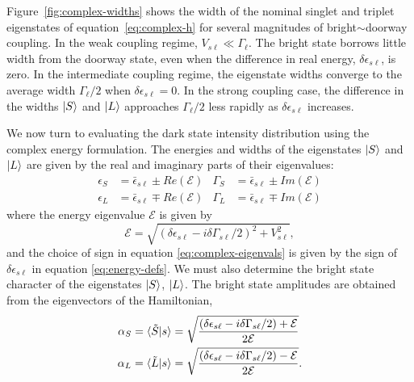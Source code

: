 Figure~\ref{fig:complex-widths} shows the width of the nominal singlet
and triplet eigenstates of equation~\ref{eq:complex-h} for several
magnitudes of bright$\sim$doorway coupling.  In the weak coupling
regime, $V_{s\ell} \ll \Gamma_{\ell}$. The bright state borrows little
width from the doorway state, even when the difference in real energy,
$\delta \epsilon_{s\ell}$, is zero. In the intermediate coupling
regime, the eigenstate widths converge to the average width
$\Gamma_{\ell}/2$ when $\delta \epsilon_{s\ell} = 0$. In the strong
coupling case, the difference in the widths $\mathinner{|{S}\rangle}$ and $\mathinner{|{L}\rangle}$
approaches $\Gamma_{\ell} / 2$ less rapidly as $\delta
\epsilon_{s\ell}$ increases.

We now turn to evaluating the dark state intensity distribution using
the complex energy formulation.  The energies and widths of the
eigenstates $\mathinner{|{S}\rangle}$ and $\mathinner{|{L}\rangle}$ are given by the real and
imaginary parts of their eigenvalues:
\begin{subequations}
  \label{eq:complex-eigenvals}
  \begin{align}
    \epsilon_{S}& = 
      \bar{\epsilon}_{s \ell} \pm Re \left ( \mathcal{E} \right ) &
    \Gamma_{S}& = 
      \bar{\epsilon}_{s \ell} \pm Im \left ( \mathcal{E} \right ) \\
    \epsilon_{L}& = 
      \bar{\epsilon}_{s \ell} \mp Re \left ( \mathcal{E} \right ) &
    \Gamma_{L}& = 
      \bar{\epsilon}_{s \ell} \mp Im \left ( \mathcal{E} \right )
  \end{align}
\end{subequations}
where the energy eigenvalue $\mathcal{E}$ is given by
\begin{equation}
     \mathcal{E} = \sqrt{(\delta \epsilon_{s\ell} - i \delta \Gamma_{s\ell} / 2)^2 
       + V_{s\ell}^2},
\end{equation}
and the choice of sign in equation \ref{eq:complex-eigenvals} is given
by the sign of $\delta \epsilon_{s \ell}$ in equation
\ref{eq:energy-defs}.  We must also determine the bright state
character of the eigenstates $\mathinner{|{S}\rangle}$, $\mathinner{|{L}\rangle}$.  The bright state
amplitudes are obtained from the eigenvectors of the Hamiltonian,
\begin{subequations}
  \begin{align}
    \alpha_S =
    \mathinner{\langle{\tilde{S}|s}\rangle}& = 
     \sqrt{\frac
       {(\delta \epsilon_{s\ell} - i \delta \Gamma_{s\ell}/2) + \mathcal{E}}
       {2 \mathcal{E}}} \\
     \alpha_L =
     \mathinner{\langle{\tilde{L}|s}\rangle}& = 
     \sqrt{\frac
       {(\delta \epsilon_{s\ell} - i \delta \Gamma_{s\ell}/2) - \mathcal{E}}
       {2 \mathcal{E}}}.
   \end{align}
\end{subequations}
